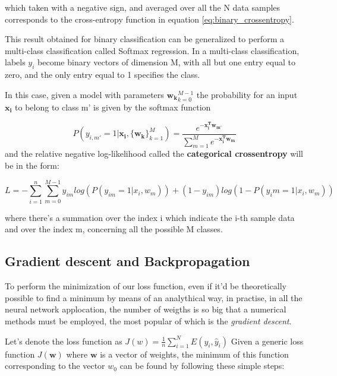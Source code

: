 \documentclass[a4paper,11pt]{article}
\begin{document}
which taken with a negative sign, and averaged over all the N data samples corresponds to the cross-entropy function in equation \ref{eq:binary_crossentropy}.


This result obtained for binary classification can be generalized to perform a multi-class classification called Softmax regression.
In a multi-class classification, labels $y_i$ become binary vectors of dimension M, with all but one entry equal to zero, and the only entry equal to 1 specifies the class.

In this case, given a model with parameters $\mathbf{w_k}_{k=0}^{M-1}$ the probability for an input $\mathbf{x_i}$ to belong to class m' is given by the softmax function

\begin{equation}
P(y_{i,m'}= 1 | \mathbf{x_i}, \{\mathbf{w_k} \}_{k=1}^M ) = \frac{e^{-\mathbf{x_i^T w_{m'}}} }{\sum_{m = 1}^{M} e^{-\mathbf{x_i^T w_{m}}}}
\end{equation}
and the relative negative log-likelihood called the \textbf{categorical crossentropy} will be in the form:

\begin{equation}
L = -\sum_{i=1}^{n} \sum_{m= 0}^{M-1} y_{im} log(P(y_{im}=1|x_i, w_m)) + (1-y_{im})log(1-P(y_im=1|x_i, w_m))
\end{equation}

where there's a summation over the index i which indicate the i-th sample data and over the index m, concerning all the possible M classes.



\subsection{Gradient descent and Backpropagation}

To perform the minimization of our loss function, even if it'd be theoretically possible to find a minimum by means of an analythical way, in practise, in all the neural network applocation, the number of weigths is so big that a numerical methods must be employed, the most popular of which is the \emph{gradient descent}.

Let's denote the loss function as $J(w) = \frac{1}{n}\sum_{i = 1}^N E(y_i, \hat y_i)$
Given a generic loss function $J(\textbf{w})$ where $\textbf{w}$ is a vector of weights, the minimum of this function corresponding to the vector $w_0$ can be found by following these simple steps:
\end{document}
